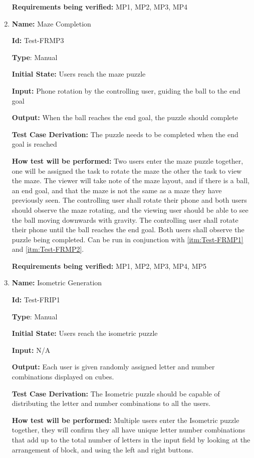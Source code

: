 \documentclass[12pt, titlepage]{article}
\begin{document}
\begin{enumerate}
\textbf{Requirements being verified: } MP1, MP2, MP3, MP4

\item{\textbf{Name:} Maze Completion} \label{itm:Test-FRMP3}

\textbf{Id:} Test-FRMP3

\textbf{Type}: Manual

\textbf{Initial State:} Users reach the maze puzzle

\textbf{Input:} Phone rotation by the controlling user, guiding the ball to the end goal

\textbf{Output:} When the ball reaches the end goal, the puzzle should complete

\textbf{Test Case Derivation:} The puzzle needs to be completed when the end goal is reached

\textbf{How test will be performed:} Two users enter the maze puzzle together, one will be assigned the task to rotate the maze the other the task to view the maze. The viewer will take note of the maze layout, and if there is a ball, an end goal, and that the maze is not the same as a maze they have previously seen. The controlling user shall rotate their phone and both users should observe the maze rotating, and the viewing user should be able to see the ball moving downwards with gravity. The controlling user shall rotate their phone until the ball reaches the end goal. Both users shall observe the puzzle being completed. Can be run in conjunction with \ref{itm:Test-FRMP1} and \ref{itm:Test-FRMP2}.

\textbf{Requirements being verified: } MP1, MP2, MP3, MP4, MP5

\item{\textbf{Name:} Isometric Generation} \label{itm:Test-FRIP1}

\textbf{Id:} Test-FRIP1

\textbf{Type}: Manual

\textbf{Initial State:} Users reach the isometric puzzle

\textbf{Input:} N/A

\textbf{Output:} Each user is given randomly assigned letter and number combinations displayed on cubes. 

\textbf{Test Case Derivation:} The Isometric puzzle should be capable of distributing the letter and number combinations to all the users. 

\textbf{How test will be performed:} Multiple users enter the Isometric puzzle together, they will confirm they all have unique letter number combinations that add up to the total number of letters in the input field by looking at the arrangement of block, and using the left and right buttons. 


\end{enumerate}
\end{document}
